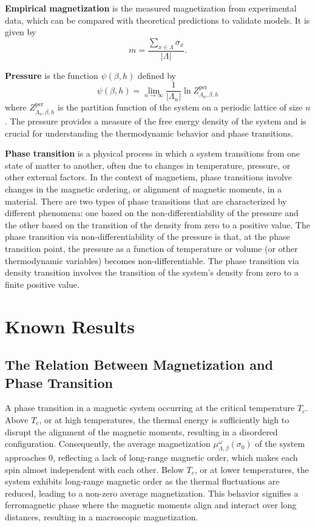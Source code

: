 \documentclass[11pt]{book}
\begin{document}
\textbf{Empirical magnetization} is the measured magnetization from experimental data, which can be compared with theoretical predictions to validate models. It is given by 
\begin{equation}\label{Empirical_Magnetization}
m = \frac {\sum_{x \in \Lambda} \sigma_x}{|\Lambda|}.
\end{equation}

\textbf{Pressure} is the function \(\psi(\beta, h)\) defined by
\begin{equation}\label{Pressure_Function}
\psi(\beta, h) = \lim_{n \to \infty} \frac{1}{|\Lambda_n|} \ln Z^{\text{per}}_{\Lambda_n, \beta, h}
\end{equation}
where \(Z^{\text{per}}_{\Lambda_n, \beta, h}\) is the partition function of the system on a periodic lattice of size \(n\). The pressure provides a measure of the free energy density of the system and is crucial for understanding the thermodynamic behavior and phase transitions.

\textbf{Phase transition} 
is a physical process in which a system transitions from one state of matter to another, often due to changes in temperature, pressure, or other external factors. In the context of magnetism, phase transitions involve changes in the magnetic ordering, or alignment of magnetic moments, in a material. There are two types of phase transitions that are characterized by different phenomena: one based on the non-differentiability of the pressure and the other based on the transition of the density from zero to a positive value. The phase transition via non-differentiability of the pressure is that, at the phase transition point, the pressure as a function of temperature or volume (or other thermodynamic variables) becomes non-differentiable. The phase transition via density transition involves the transition of the system’s density from zero to a finite positive value.

\section{Known Results}
\subsection{The Relation Between Magnetization and Phase Transition}

A phase transition in a magnetic system occurring at the critical temperature $T_c$. Above $T_c$, or at high temperatures, the thermal energy is sufficiently high to disrupt the alignment of the magnetic moments, resulting in a disordered configuration. Consequently, the average magnetization $\mu ^\omega _ {\Lambda,\beta} (\sigma_0)$ of the system approaches $0$, reflecting a lack of long-range magnetic order, which makes each spin almost independent with each other. Below $T_c$, or at lower temperatures, the system exhibits long-range magnetic order as the thermal fluctuations are reduced, leading to a non-zero average magnetization. This behavior signifies a ferromagnetic phase where the magnetic moments align and interact over long distances, resulting in a macroscopic magnetization.
\end{document}
